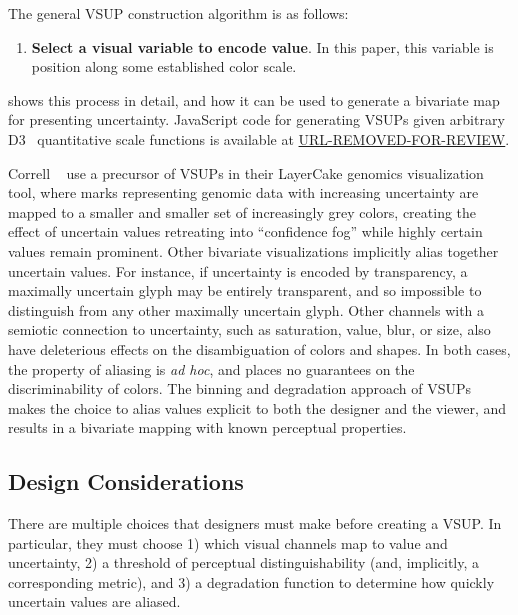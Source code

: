 The general VSUP construction algorithm is as follows:

\begin{enumerate}
	\item \textbf{Select a visual variable to encode value}. In this paper, this variable is position along some established color scale.
\end{enumerate}

 shows this process in detail, and how it can be used to generate a bivariate map for presenting uncertainty. JavaScript code for generating VSUPs given arbitrary D3~\cite{bostock2011d3} quantitative scale functions is available at \url{URL-REMOVED-FOR-REVIEW}.

Correll \ea~\cite{correll2015layercake,correll2011visualizing} use a precursor of VSUPs in their LayerCake genomics visualization tool, where marks representing genomic data with increasing uncertainty are mapped to a smaller and smaller set of increasingly grey colors, creating the effect of uncertain values retreating into ``confidence fog'' while highly certain values remain prominent. Other bivariate visualizations implicitly alias together uncertain values. For instance, if uncertainty is encoded by transparency, a maximally uncertain glyph may be entirely transparent, and so impossible to distinguish from any other maximally uncertain glyph. Other channels with a semiotic connection to uncertainty, such as saturation, value, blur, or size, also have deleterious effects on the disambiguation of colors and shapes. In both cases, the property of aliasing is \emph{ad hoc}, and places no guarantees on the discriminability of colors. The binning and degradation approach of VSUPs makes the choice to alias values explicit to both the designer and the viewer, and results in a bivariate mapping with known perceptual properties.

\subsection{Design Considerations}

\performanceFig

There are multiple choices that designers must make before creating a VSUP. In particular, they must choose 1) which visual channels map to value and uncertainty, 2) a threshold of perceptual distinguishability (and, implicitly, a corresponding metric), and 3) a degradation function to determine how quickly uncertain values are aliased.

